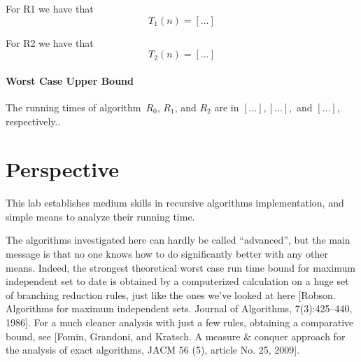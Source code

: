 \documentclass{tufte-handout}
\begin{document}
For R1 we have that
 \[
 T_1(n)=[\ldots]
 \]

For R2 we have that
 \[
 T_2(n)=[\ldots]
 \]
\paragraph{Worst Case Upper Bound}
The running times of algorithm~$R_0$, $R_1$, and $R_2$ are in
$[\ldots],[\ldots],$ and $[\ldots]$, respectively.. \newpage


\newpage
\section{ Perspective}

This lab establishes medium skills in recursive algorithms implementation,
and simple means to analyze their running time.

\bigskip

The algorithms investigated here can hardly be called ``advanced'', but the main message 
is that no one knows how to do significantly better with any other means.
Indeed, the strongest theoretical worst case run time bound for maximum independent set to date
is obtained by a computerized calculation on a huge set of branching reduction rules, just like the ones we've looked at here [Robson. Algorithms for maximum independent sets. Journal of Algorithms, 7(3):425--440, 1986]. For a much cleaner analysis with just a few rules, obtaining a comparative bound, see [Fomin, Grandoni, and Kratsch. A measure \& conquer approach for the analysis of exact algorithms, JACM 56 (5), article No. 25, 2009].
\end{document}
